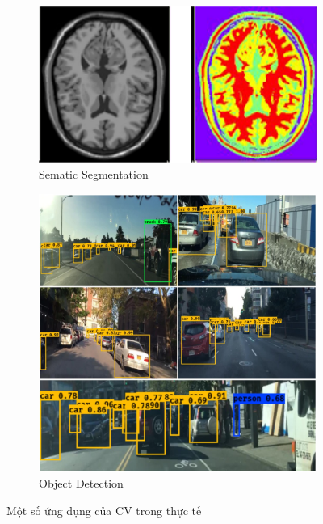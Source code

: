 \documentclass{article}
\begin{document}
\begin{figure}[ht!]
    \centering
    \begin{subfigure}[b]{0.45\linewidth}
    \includegraphics[width = \linewidth]{42979_2021_704_Fig6_HTML.png}
    \caption{Sematic Segmentation}
    \label{fig1a}
    \end{subfigure}
    \begin{subfigure}[b]{0.45\linewidth}
        \includegraphics[width = \linewidth]{Test Image Output15a821b.jpg}
        \caption{Object Detection}
        \label{fig1b}
    \end{subfigure}
    \label{fig1}
    \caption{Một số ứng dụng của CV trong thực tế}
\end{figure}
\end{document}
